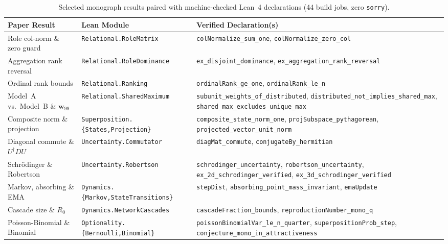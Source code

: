 \begin{table}[htbp]
\centering
\scriptsize
\caption{Selected monograph results paired with machine-checked Lean~4 declarations (44 build jobs, zero \texttt{sorry}).}
\label{tab:lean-map}
\begin{tabularx}{\textwidth}{@{}llL@{}}
\toprule
Paper Result & Lean Module & Verified Declaration(s) \\
\midrule
Role col-norm \& zero guard & \texttt{Relational.RoleMatrix} & \texttt{colNormalize\_sum\_one}, \texttt{colNormalize\_zero\_col} \\
Aggregation rank reversal & \texttt{Relational.RoleDominance} & \texttt{ex\_disjoint\_dominance}, \texttt{ex\_aggregation\_\allowbreak{}rank\_reversal} \\
Ordinal rank bounds & \texttt{Relational.Ranking} & \texttt{ordinalRank\_ge\_one}, \texttt{ordinalRank\_le\_n} \\
Model~A vs.\ Model~B \& $\mathbf{w}_{99}$ & \texttt{Relational.SharedMaximum} & \texttt{subunit\_weights\_\allowbreak{}of\_distributed}, \texttt{distributed\_not\_\allowbreak{}implies\_shared\_max}, \texttt{shared\_max\_\allowbreak{}excludes\_unique\_max} \\
Composite norm \& projection & \texttt{Superposition.\{States,Projection\}} & \texttt{composite\_state\_norm\_one}, \texttt{projSubspace\_\allowbreak{}pythagorean}, \texttt{projected\_vector\_unit\_norm} \\
Diagonal commute \& $U^\dagger D U$ & \texttt{Uncertainty.Commutator} & \texttt{diagMat\_commute}, \texttt{conjugateBy\_hermitian} \\
Schr\"odinger \& Robertson & \texttt{Uncertainty.Robertson} & \texttt{schrodinger\_uncertainty}, \texttt{robertson\_uncertainty}, \texttt{ex\_2d\_schrodinger\_verified}, \texttt{ex\_3d\_schrodinger\_verified} \\
Markov, absorbing \& EMA & \texttt{Dynamics.\{Markov,StateTransitions\}} & \texttt{stepDist}, \texttt{absorbing\_point\_\allowbreak{}mass\_invariant}, \texttt{emaUpdate} \\
Cascade size \& $R_0$ & \texttt{Dynamics.NetworkCascades} & \texttt{cascadeFraction\_bounds}, \texttt{reproductionNumber\_mono\_q} \\
Poisson-Binomial \& Binomial & \texttt{Optionality.\{Bernoulli,Binomial\}} & \texttt{poissonBinomialVar\_\allowbreak{}le\_n\_quarter}, \texttt{superpositionProb\_step}, \texttt{conjecture\_mono\_\allowbreak{}in\_attractiveness} \\
\bottomrule
\end{tabularx}
\end{table}

